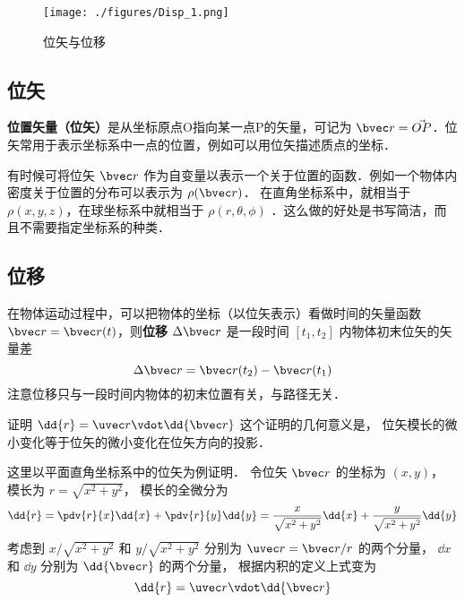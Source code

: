 

\begin{figure}[ht]
\centering
\texttt{[image: ./figures/Disp\_1.png]}
\caption{位矢与位移} \label{Disp_fig1}
\end{figure}

\subsection{位矢}

\textbf{位置矢量（位矢）}是从坐标原点O指向某一点P的矢量，可记为 $\bvec r=\vec{OP}$．位矢常用于表示坐标系中一点的位置，例如可以用位矢描述质点的坐标．

有时候可将位矢 $\bvec r$ 作为自变量以表示一个关于位置的函数．例如一个物体内密度关于位置的分布可以表示为 $\rho(\bvec r)$． 在直角坐标系中，就相当于 $\rho(x,y,z)$，在球坐标系中就相当于 $\rho(r,\theta,\phi)$ ．这么做的好处是书写简洁，而且不需要指定坐标系的种类．

\subsection{位移}
在物体运动过程中，可以把物体的坐标（以位矢表示）看做时间的矢量函数 $\bvec r=\bvec r(t)$，则\textbf{位移} $\Delta \bvec r$ 是一段时间 $[t_1,t_2]$ 内物体初末位矢的矢量差
\begin{equation}
\Delta \bvec r = \bvec r(t_2) - \bvec r(t_1)
\end{equation}
注意位移只与一段时间内物体的初末位置有关，与路径无关．

\begin{example}{证明 $\dd{r} = \uvec r \vdot \dd{\bvec r}$}\label{Disp_ex1}
这个证明的几何意义是， 位矢模长的微小变化等于位矢的微小变化在位矢方向的投影．

这里以平面直角坐标系中的位矢为例证明． 令位矢 $\bvec r$ 的坐标为 $(x, y)$， 模长为 $r = \sqrt{x^2 + y^2}$，
模长的全微分为
\begin{equation}
\dd{r} = \pdv{r}{x} \dd{x} + \pdv{r}{y} \dd{y} = \frac{x}{\sqrt{x^2 + y^2}} \dd{x} + \frac{y}{\sqrt{x^2 + y^2}} \dd{y}
\end{equation}
考虑到 $x/\sqrt{x^2 + y^2}$ 和 $y/\sqrt{x^2 + y^2}$ 分别为 $\uvec r = \bvec r/r$ 的两个分量， $\dd{x}$ 和 $\dd{y}$ 分别为 $\dd{\bvec r}$ 的两个分量， 根据内积的定义上式变为
\begin{equation}
\dd{r} = \uvec r \vdot \dd{\bvec r}
\end{equation}
\end{example}
